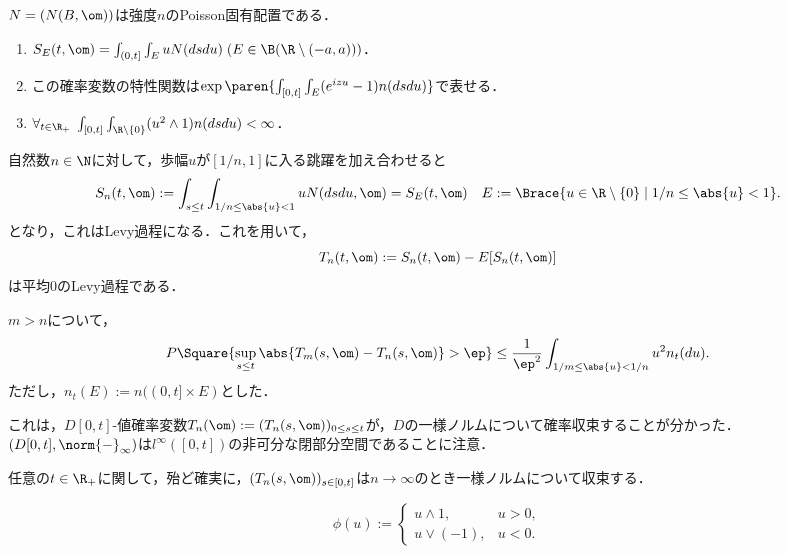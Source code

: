 \documentclass[uplatex,dvipdfmx]{jsreport}
\begin{document}
\begin{lemma}
    $N=(N(B,\om))$は強度$n$のPoisson固有配置である．
\end{lemma}

\begin{lemma}\mbox{}
    \begin{enumerate}
        \item $S_E(t,\om)=\int_{(0,t]}\int_E uN(dsdu)\;(E\in\B(\R\setminus(-a,a)))$．
        \item この確率変数の特性関数は$\exp\paren{\int_{[0,t]}\int_E(e^{izu}-1)n(dsdu)}$で表せる．
        \item $\forall_{t\in\R_+}\;\int_{[0,t]}\int_{\R\setminus\{0\}}(u^2\land 1)n(dsdu)<\infty$．
    \end{enumerate}
\end{lemma}

\begin{notation}
    自然数$n\in\N$に対して，歩幅$u$が$[1/n,1]$に入る跳躍を加え合わせると
    \[S_n(t,\om):=\int_{s\le t}\int_{1/n\le\abs{u}<1}uN(dsdu,\om)=S_E(t,\om)\quad E:=\Brace{u\in\R\setminus\{0\}\mid 1/n\le\abs{u}<1}.\]
    となり，これはLevy過程になる．これを用いて，
    \[T_n(t,\om):=S_n(t,\om)-E[S_n(t,\om)]\]
    は平均$0$のLevy過程である．
\end{notation}

\begin{lemma}
    $m>n$について，
    \[P\Square{\sup_{s\le t}\abs{T_m(s,\om)-T_n(s,\om)}>\ep}\le\frac{1}{\ep^2}\int_{1/m\le\abs{u}<1/n}u^2n_t(du).\]
    ただし，$n_t(E):=n((0,t]\times E)$とした．
\end{lemma}
\begin{remarks}
    これは，$D[0,t]$-値確率変数$T_n(\om):=(T_n(s,\om))_{0\le s\le t}$が，$D$の一様ノルムについて確率収束することが分かった．
    $(D[0,t],\norm{-}_\infty)$は$l^\infty([0,t])$の非可分な閉部分空間であることに注意．
\end{remarks}

\begin{lemma}[Banach空間値確率変数の概収束性]
    任意の$t\in\R_+$に関して，殆ど確実に，$(T_n(s,\om))_{s\in[0,t]}$は$n\to\infty$のとき一様ノルムについて収束する．
\end{lemma}

\begin{notation}
    \[\phi(u):=\begin{cases}
        u\land 1,&u>0,\\
        u\lor(-1),&u<0.
    \end{cases}\]
\end{notation}
\end{document}
